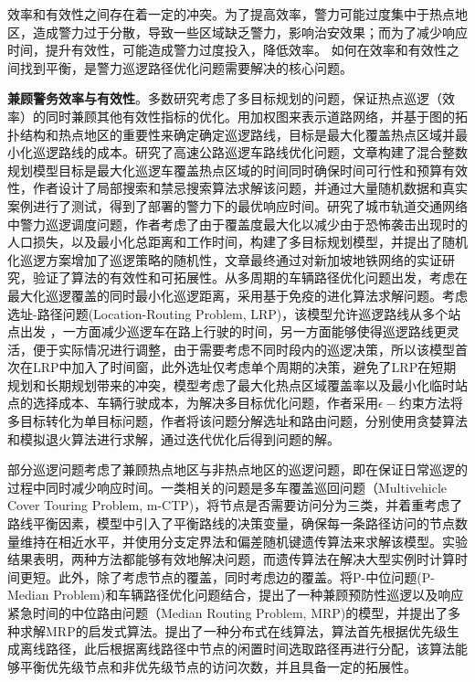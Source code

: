 \documentclass[finalformat,mathCMR]{HUSTthesis}
\begin{document}
效率和有效性之间存在着一定的冲突。为了提高效率，警力可能过度集中于热点地区，造成警力过于分散，导致一些区域缺乏警力，影响治安效果；而为了减少响应时间，提升有效性，可能造成警力过度投入，降低效率。 如何在效率和有效性之间找到平衡，是警力巡逻路径优化问题需要解决的核心问题。

\textbf{兼顾警务效率与有效性}。多数研究考虑了多目标规划的问题，保证热点巡逻（效率）的同时兼顾其他有效性指标的优化。\citep{chawatheOrganizingHotspotPolice2007a}用加权图来表示道路网络，并基于图的拓扑结构和热点地区的重要性来确定确定巡逻路线，目标是最大化覆盖热点区域并最小化巡逻路线的成本。\citep{keskinAnalysisIntegratedMaximum2012}研究了高速公路巡逻车路线优化问题，文章构建了混合整数规划模型目标是最大化巡逻车覆盖热点区域的时间同时确保时间可行性和预算有效性，作者设计了局部搜索和禁忌搜索算法求解该问题，并通过大量随机数据和真实案例进行了测试，得到了部署的警力下的最优响应时间。\citep{lauPatrolSchedulingUrban2016}研究了城市轨道交通网络中警力巡逻调度问题，作者考虑了由于覆盖度最大化以减少由于恐怖袭击出现时的人口损失，以及最小化总距离和工作时间，构建了多目标规划模型，并提出了随机化巡逻方案增加了巡逻策略的随机性，文章最终通过对新加坡地铁网络的实证研究，验证了算法的有效性和可拓展性。\citep{hsiehNovelEncodingScheme2015}从多周期的车辆路径优化问题出发，考虑在最大化巡逻覆盖的同时最小化巡逻距离，采用基于免疫的进化算法求解问题。\citep{liBicriteriaDynamicLocationrouting2014b}考虑选址-路径问题(Location-Routing Problem, LRP)，该模型允许巡逻路线从多个站点出发 ，一方面减少巡逻车在路上行驶的时间，另一方面能够使得巡逻路线更灵活，便于实际情况进行调整，由于需要考虑不同时段内的巡逻决策，所以该模型首次在LRP中加入了时间窗，此外选址仅考虑单个周期的决策，避免了LRP在短期规划和长期规划带来的冲突，模型考虑了最大化热点区域覆盖率以及最小化临时站点的选择成本、车辆行驶成本，为解决多目标优化问题，作者采用$\epsilon -$约束方法将多目标转化为单目标问题，作者将该问题分解选址和路由问题，分别使用贪婪算法和模拟退火算法进行求解，通过迭代优化后得到问题的解。

部分巡逻问题考虑了兼顾热点地区与非热点地区的巡逻问题，即在保证日常巡逻的过程中同时减少响应时间。一类相关的问题是多车覆盖巡回问题（Multivehicle Cover Touring Problem, m-CTP)\citep{hachichaHeuristicsMultivehicleCovering2000}，\citep{otaFlowbasedModelMultivehicle2024}将节点是否需要访问分为三类，并着重考虑了路线平衡因素，模型中引入了平衡路线的决策变量，确保每一条路径访问的节点数量维持在相近水平，并使用分支定界法和偏差随机键遗传算法来求解该模型。实验结果表明，两种方法都能够有效地解决问题，而遗传算法在解决大型实例时计算时间更短。此外，\citep{tanIntransitVigilantCovering2016}除了考虑节点的覆盖，同时考虑边的覆盖。\citep{huizingMedianRoutingProblem2020a}将P-中位问题(P-Median Problem)和车辆路径优化问题结合，提出了一种兼顾预防性巡逻以及响应紧急时间的中位路由问题（Median Routing Problem, MRP)的模型，并提出了多种求解MRP的启发式算法。\citep{katoleBalancingPrioritiesPatrolling2023}提出了一种分布式在线算法，算法首先根据优先级生成离线路径，此后根据离线路径中节点的闲置时间选取路径再进行分配，该算法能够平衡优先级节点和非优先级节点的访问次数，并且具备一定的拓展性。
\end{document}
